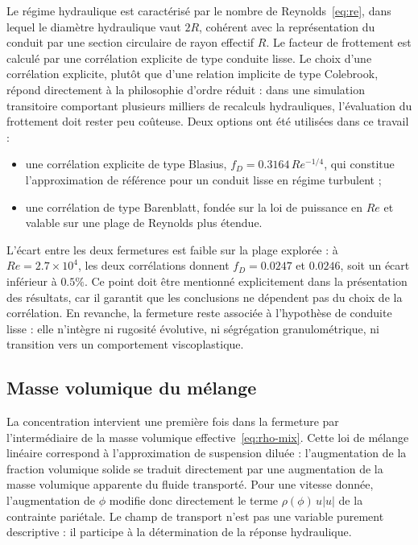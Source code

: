 \documentclass[11pt,a4paper]{report}
\begin{document}
Le régime hydraulique est caractérisé par le nombre de Reynolds~\eqref{eq:re}, dans lequel le diamètre
hydraulique vaut \(2R\), cohérent avec la représentation du conduit par une section circulaire de rayon
effectif \(R\). Le facteur de frottement est calculé par une corrélation explicite de type conduite lisse.
Le choix d'une corrélation explicite, plutôt que d'une relation implicite de type Colebrook, répond
directement à la philosophie d'ordre réduit : dans une simulation transitoire comportant plusieurs milliers
de recalculs hydrauliques, l'évaluation du frottement doit rester peu coûteuse. Deux options ont été
utilisées dans ce travail :
\begin{itemize}
  \item une corrélation explicite de type Blasius, \(f_D = 0.3164\,Re^{-1/4}\), qui constitue
        l'approximation de référence pour un conduit lisse en régime turbulent ;
  \item une corrélation de type Barenblatt, fondée sur la loi de puissance en \(Re\) et valable sur une
        plage de Reynolds plus étendue.
\end{itemize}
L'écart entre les deux fermetures est faible sur la plage explorée : à \(Re = 2.7\times10^{4}\), les deux
corrélations donnent \(f_D = 0.0247\) et \(0.0246\), soit un écart inférieur à \(0.5\%\). Ce point doit être
mentionné explicitement dans la présentation des résultats, car il garantit que les conclusions ne
dépendent pas du choix de la corrélation. En revanche, la fermeture reste associée à l'hypothèse de
conduite lisse : elle n'intègre ni rugosité évolutive, ni ségrégation granulométrique, ni transition vers
un comportement viscoplastique.

\subsection{Masse volumique du mélange}

La concentration intervient une première fois dans la fermeture par l'intermédiaire de la masse volumique
effective~\eqref{eq:rho-mix}. Cette loi de mélange linéaire correspond à l'approximation de suspension
diluée : l'augmentation de la fraction volumique solide se traduit directement par une augmentation de la
masse volumique apparente du fluide transporté. Pour une vitesse donnée, l'augmentation de \(\phi\) modifie
donc directement le terme \(\rho(\phi)\,u|u|\) de la contrainte pariétale. Le champ de transport n'est pas
une variable purement descriptive : il participe à la détermination de la réponse hydraulique.
\end{document}
